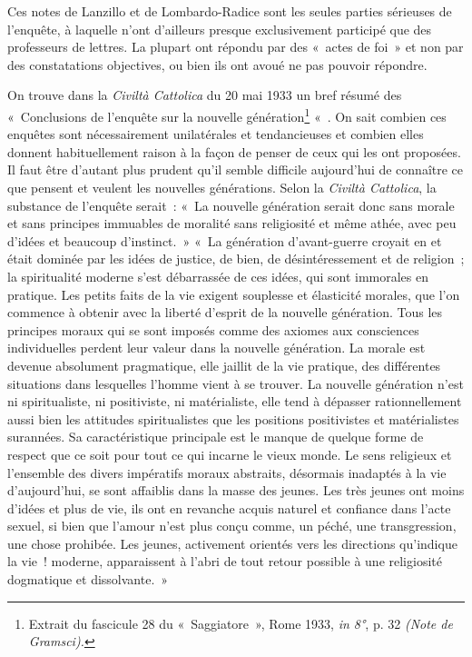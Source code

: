 \documentclass[french,twoside]{book} %
\begin{document}
Ces notes de Lanzillo et de Lombardo-Radice sont les seules parties sérieuses de l’enquête, à laquelle n’ont d’ailleurs presque exclusivement participé que des professeurs de lettres. La plupart ont répondu par des « actes de foi » et non par des constatations objectives, ou bien ils ont avoué ne pas pouvoir répondre.\par
On trouve dans la \emph{Civiltà Cattolica} du 20 mai 1933 un bref résumé des « Conclusions de l’enquête sur la nouvelle génération\footnote{Extrait du fascicule 28 du « Saggiatore », Rome 1933, \emph{in 8°}, p. 32 \emph{(Note de Gramsci).}} « . On sait combien ces enquêtes sont nécessairement unilatérales et tendancieuses et combien elles donnent habituellement raison à la façon de penser de ceux qui les ont proposées. Il faut être d’autant plus prudent qu’il semble difficile aujourd’hui de connaître ce que pensent et veulent les nouvelles générations. Selon la \emph{Civiltà Cattolica}, la substance de l’enquête serait : « La nouvelle génération serait donc sans morale et sans principes immuables de moralité sans religiosité et même athée, avec peu d’idées et beaucoup d’instinct. » « La génération d’avant-guerre croyait en et était dominée par les idées de justice, de bien, de désintéressement et de religion ; la spiritualité moderne s’est débarrassée de ces idées, qui sont immorales en pratique. Les petits faits de la vie exigent souplesse et élasticité morales, que l’on commence à obtenir avec la liberté d’esprit de la nouvelle génération. Tous les principes moraux qui se sont imposés comme des axiomes aux consciences individuelles perdent leur valeur dans la nouvelle génération. La morale est devenue absolument pragmatique, elle jaillit de la vie pratique, des différentes situations dans lesquelles l’homme vient à se trouver. La nouvelle génération n’est ni spiritualiste, ni positiviste, ni matérialiste, elle tend à dépasser rationnellement aussi bien les attitudes spiritualistes que les positions positivistes et matérialistes surannées. Sa caractéristique principale est le manque de quelque forme de respect que ce soit pour tout ce qui incarne le vieux monde. Le sens religieux et l’ensemble des divers impératifs moraux abstraits, désormais inadaptés à la vie d’aujourd’hui, se sont affaiblis dans la masse des jeunes. Les très jeunes ont moins d’idées et plus de vie, ils ont en revanche acquis naturel et confiance dans l’acte sexuel, si bien que l’amour n’est plus conçu comme, un péché, une transgression, une chose prohibée. Les jeunes, activement orientés vers les directions qu’indique la vie ! moderne, apparaissent à l’abri de tout retour possible à une religiosité dogmatique et dissolvante. »\par
\end{document}
